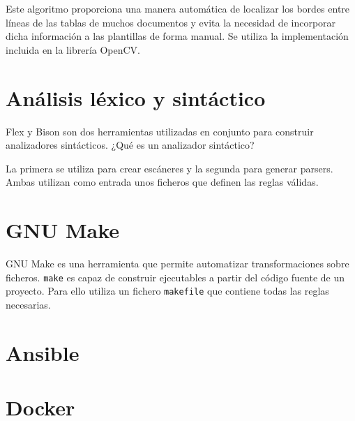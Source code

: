 Este algoritmo proporciona una manera automática de localizar los bordes entre líneas de las tablas de muchos documentos y evita la necesidad de incorporar dicha información a las plantillas de forma manual. Se utiliza la implementación incluida en la librería OpenCV.

\section{Análisis léxico y sintáctico}

Flex y Bison son dos herramientas utilizadas en conjunto para construir analizadores sintácticos. ¿Qué es un analizador sintáctico?

La primera se utiliza para crear escáneres y la segunda para generar parsers. Ambas utilizan como entrada unos ficheros que definen las reglas válidas.

\section{GNU Make}

GNU Make es una herramienta que permite automatizar transformaciones sobre ficheros. \verb|make| es capaz de construir ejecutables a partir del código fuente de un proyecto. Para ello utiliza un fichero \verb|makefile| que contiene todas las reglas necesarias.

\section{Ansible}

\section{Docker}

